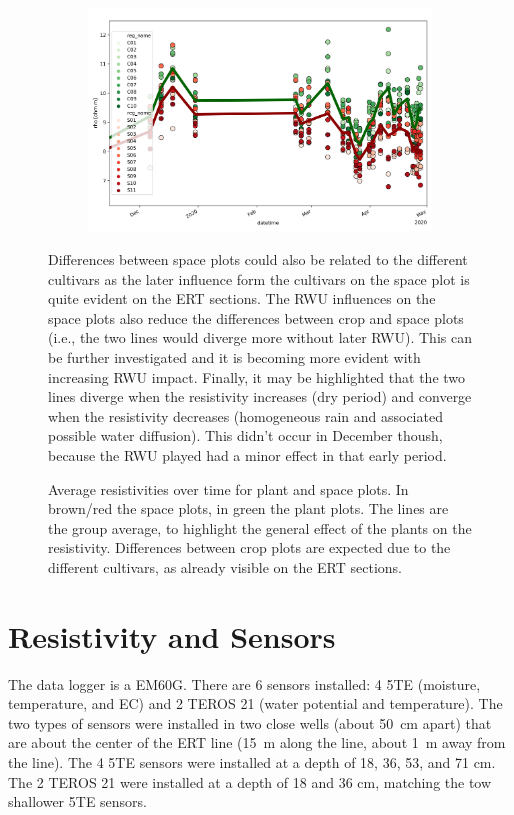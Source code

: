 \documentclass[a4paper,12pt]{article}
\begin{document}
\begin{figure}[H]
\centering
\begin{subfigure}{\textwidth}
\includegraphics[width=\textwidth]{plot_analysis.png}
\end{subfigure}
\caption{Average resistivities over time for plant and space plots.
In brown/red the space plots, in green the plant plots.
The lines are the group average, to highlight the general effect of the plants on the resistivity.
Differences between crop plots are expected due to the different cultivars, as already visible on the ERT sections.}
Differences between space plots could also be related to the different cultivars as the later influence form the cultivars on the space plot is quite evident on the ERT sections.
The RWU influences on the space plots also reduce the differences between crop and space plots (i.e., the two lines would diverge more without later RWU).
This can be further investigated and it is becoming more evident with increasing RWU impact.
Finally, it may be highlighted that the two lines diverge when the resistivity increases (dry period) and converge when the resistivity decreases (homogeneous rain and associated possible water diffusion).
This didn't occur in December thoush, because the RWU played had a minor effect in that early period.
\end{figure}

\section{Resistivity and Sensors}

The data logger is a EM60G.
There are 6 sensors installed: 4 5TE (moisture, temperature, and EC) and 2 TEROS 21 (water potential and temperature).
The two types of sensors were installed in two close wells (about \SI{50}{\centi\meter} apart) that are about the center of the ERT line (\SI{15}{m} along the line, about \SI{1}{\meter} away from the line).
The 4 5TE sensors were installed at a depth of \num{18}, \num{36}, \num{53}, and \num{71} \si{\centi\meter}.
The 2 TEROS 21 were installed at a depth of \num{18} and \num{36} \si{\centi\meter}, matching the tow shallower 5TE sensors.
\end{document}
